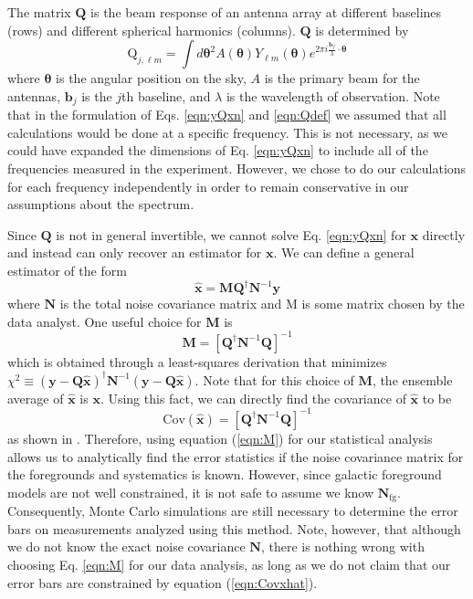\documentclass[twolcolumn,apj]{emulateapj}
\newcommand{\y}{\mathbf{y}}
\newcommand{\N}{\mathbf{N}}
\newcommand{\Q}{\mathbf{Q}}
\newcommand{\M}{\mathbf{M}}
\begin{document}
The matrix $\Q$ is the beam response of an antenna array at different baselines (rows) and different spherical harmonics (columns). $\Q$ is determined by 
\begin{equation}
\textrm{Q}_{j,\ell m} = \int d \boldsymbol \theta^2 A(\boldsymbol \theta) Y_{\ell m}(\boldsymbol \theta) e^{2\pi i \frac{\mathbf{b_\textit{j}}}{\lambda} \cdot \boldsymbol \theta}
\label{eqn:Qdef}
\end{equation}
where $\boldsymbol \theta$ is the angular position on the sky, $A$ is the primary beam for the antennas, $\mathbf{b_{\textit{j}}}$ is the $j$th baseline, and $\lambda$ is the wavelength of observation. Note that in the formulation of Eqs. \eqref{eqn:yQxn} and \eqref{eqn:Qdef} we assumed that all calculations would be done at a specific frequency. This is not necessary, as we could have expanded the dimensions of Eq. \eqref{eqn:yQxn} to include all of the frequencies measured in the experiment. However, we chose to do our calculations for each frequency independently in order to remain conservative in our assumptions about the spectrum.

Since $\Q$ is not in general invertible, we cannot solve Eq. \eqref{eqn:yQxn} for $\mathbf{x}$ directly and instead can only recover an estimator for $\mathbf{x}$. We can define a general estimator of the form 
\begin{equation}
\mathbf{\hat x} = \M \Q^\dagger \N^{-1} \y
\end{equation}
where $\N$ is the total noise covariance matrix and M is some matrix chosen by the data analyst. One useful choice for $\M$ is 
\begin{equation}
\M = [\Q^\dagger \N^{-1} \Q]^{-1}
\label{eqn:M}
\end{equation}
which is obtained through a least-squares derivation that minimizes $\chi^2 \equiv (\y-\Q \mathbf{\hat x})^\dagger \N^{-1} (\y-\Q \mathbf{\hat x})$. Note that for this choice of $\M$, the ensemble average of $\mathbf{\hat x}$ is $\mathbf{x}$.
Using this fact, we can directly find the covariance of $\mathbf{\hat x}$ to be 
\begin{equation}
\textrm{Cov}(\mathbf{\hat x}) = [\Q^\dagger \N^{-1} \Q]^{-1}
\label{eqn:Covxhat}
\end{equation}
as shown in \citet{Tegmark_CMB_maps_wli}. Therefore, using equation (\ref{eqn:M}) for our statistical analysis allows us to analytically find the error statistics if the noise covariance matrix for the foregrounds and systematics is known. However, since galactic foreground models are not well constrained, it is not safe to assume we know $\N_{\textrm{fg}}$. Consequently, Monte Carlo simulations are still necessary to determine the error bars on measurements analyzed using this method. Note, however, that although we do not know the exact noise covariance $\N$, there is nothing wrong with choosing Eq. \eqref{eqn:M} for our data analysis, as long as we do not claim that our error bars are constrained by equation (\ref{eqn:Covxhat}). %
\end{document}
